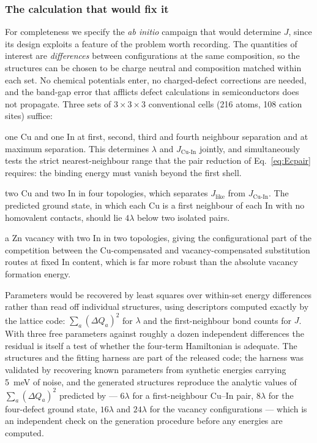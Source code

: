 \documentclass[11pt,a4paper]{article}
\newcommand{\dQ}{\Delta Q}
\newcommand{\JCuIn}{J_{\mathrm{Cu\text{-}In}}}
\newcommand{\Jlike}{J_{\mathrm{like}}}
\begin{document}
\subsubsection{The calculation that would fix it}

For completeness we specify the \textit{ab initio} campaign that would determine
$J$, since its design exploits a feature of the problem worth recording. The
quantities of interest are \emph{differences} between configurations at the same
composition, so the structures can be chosen to be charge neutral and
composition matched within each set. No chemical potentials enter, no
charged-defect corrections are needed, and the band-gap error that afflicts
defect calculations in semiconductors does not propagate. Three sets of
$3\times3\times3$ conventional cells (216 atoms, 108 cation sites) suffice:

\begin{description}\itemsep2pt
\item[Set A] one Cu and one In at first, second, third and fourth neighbour
separation and at maximum separation. This determines $\lambda$ and
$\JCuIn$ jointly, and simultaneously tests the strict nearest-neighbour range
that the pair reduction of Eq.~\eqref{eq:Ecpair} requires: the binding energy
must vanish beyond the first shell.
\item[Set B] two Cu and two In in four topologies, which separates $\Jlike$ from
$\JCuIn$. The predicted ground state, in which each Cu is a first neighbour of
each In with no homovalent contacts, should lie $4\lambda$ below two isolated
pairs.
\item[Set C] a Zn vacancy with two In in two topologies, giving the
configurational part of the competition between the Cu-compensated and
vacancy-compensated substitution routes at fixed In content, which is far more
robust than the absolute vacancy formation energy.
\end{description}

Parameters would be recovered by least squares over within-set energy
differences rather than read off individual structures, using descriptors
computed exactly by the lattice code: $\sum_a (\dQ_a)^2$ for $\lambda$ and the
first-neighbour bond counts for $J$. With three free parameters against roughly
a dozen independent differences the residual is itself a test of whether the
four-term Hamiltonian is adequate. The structures and the fitting harness are
part of the released code; the harness was validated by recovering known
parameters from synthetic energies carrying 5~meV of noise, and the generated
structures reproduce the analytic values of $\sum_a (\dQ_a)^2$ predicted by
\citet{yu2026} --- $6\lambda$ for a first-neighbour Cu--In pair, $8\lambda$ for
the four-defect ground state, $16\lambda$ and $24\lambda$ for the vacancy
configurations --- which is an independent check on the generation procedure
before any energies are computed.
\end{document}
